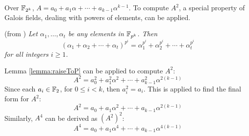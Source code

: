 Over ${\mathbb{F}}_{2^k}$, $A=a_0+a_1\alpha+\cdots+a_{k-1}\alpha^{k-1}$. To compute $A^2$,
a special property of Galois fields, dealing with powers of elements, can be applied.
\begin{Lemma}\label{lemma:raiseToP}(from \cite{galois_field:mceliece})
{\it Let $\alpha_1, \dots, \alpha_t$ be any elements in ${\mathbb{F}}_{p^k}$. Then
\begin{equation}
(\alpha_1+\alpha_2+\cdots+\alpha_t)^{p^i}=\alpha_1^{p^i}+\alpha_2^{p^i}+\cdots+\alpha_t^{p^i}
\end{equation}
for all integers $i \geq 1$. }
\end{Lemma}
Lemma \ref{lemma:raiseToP} can be applied to compute $A^2$:
\begin{equation}
A^2=a_0^2+a_1^2\alpha^2+\cdots+a_{k-1}^2\alpha^{2(k-1)}
\end{equation}
Since each $a_i \in {\mathbb{F}}_2$, for $0\leq i<k$, then $a_i^2=a_i$. This is applied 
to find the final form for $A^2$:
\begin{equation}
A^2=a_0+a_1\alpha^2+\cdots+a_{k-1}\alpha^{2(k-1)}
\end{equation}
Similarly, $A^4$ can be derived as $(A^2)^2$:
\begin{equation}
A^4=a_0+a_1\alpha^4+\cdots+a_{k-1}\alpha^{4(k-1)}
\end{equation}



